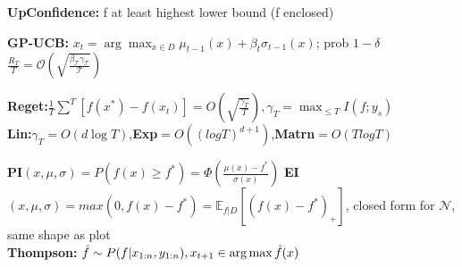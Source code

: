 \textbf{UpConfidence:} f at least highest lower bound (f enclosed)\\
\begin{comment}
	We assume here that the GP we are looking at has the function enclosed. This means, that the maximum of the function must be at least as high as the maximum lower bound. We can focus on the regions where this is true\\
\end{comment}

\textbf{GP-UCB:} $x_t = \arg \max_{x \in D} \mu_{t-1}(x) + \beta_t \sigma_{t-1}(x)$; prob $1 - \delta$ $\frac{R_T}{T} = \mathcal{O(\sqrt{\frac{\beta_T \gamma_T}{T}})}$
\begin{comment}
	The goal is to maximise the upper confidence bound.
	\textbf{Assumption:} The underlying function really is something like the prior, f.e. a Gaussian. Also, we need this to hold for all the points, so we need to do a union bound over the points. This can be solved by using a large constant $\beta$.\\
	If Beta is huge, we just do uncertainty sampling. With a proper $\beta$, we naturally incorporate exploitation around the means.\\
	The optimization function is generally non-convex, can be optimized with SGD.\\
\end{comment}

\textbf{Reget:}$\frac{1}{T}\sum^T[f(x^*) - f(x_t)] = O(\sqrt{\frac{\gamma_T}{T}}), \gamma_T = \max_{\leq T} I(f;y_s)$\\
\textbf{Lin:}$\gamma_T = O(d \log T)$,\textbf{Exp}$= O((log T)^{d+1})$,\textbf{Matrn}$= O(TlogT)$
\begin{comment}
	\textbf{Intuition:} Depending on the kernel, the regret has different convergence/ regret guarantees.\\
\end{comment}
\textbf{PI}$(x, \mu, \sigma) = P(f(x) \geq f^*) = \Phi(\frac{\mu(x) - f^*}{\sigma(x)})$
\textbf{EI}$(x, \mu, \sigma) = max(0, f(x) - f^*) = \mathbb{E}_{f|D}[(f(x) - f^*)_+] $, closed form for $\mathcal{N}$,
same shape as plot \\
\textbf{Thompson:} $\hat{f} \sim P(f|x_{1:n}, y_{1:n}), x_{t+1} \in \operatorname*{arg\,max} \hat{f}(x)$
